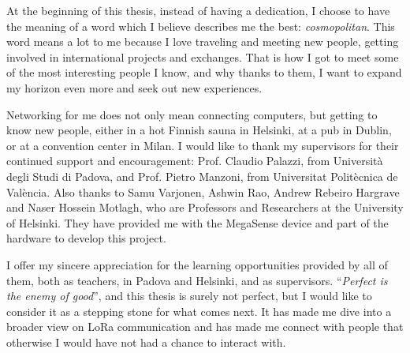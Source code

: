 
At the beginning of this thesis, instead of having a dedication, I choose to have the meaning of a word which I believe describes me the best: \textit{cosmopolitan}.
This word means a lot to me because I love traveling and meeting new people, getting involved in international projects and exchanges.
That is how I got to meet some of the most interesting people I know, and why thanks to them, I want to expand my horizon even more and seek out new experiences.

Networking for me does not only mean connecting computers, but getting to know new people, either in a hot Finnish sauna in Helsinki, at a pub in Dublin, or at a convention center in Milan.
\newline
\newline
\indent
I would like to thank my supervisors for their continued support and encouragement: Prof. Claudio Palazzi, from Università degli Studi di Padova, and Prof. Pietro Manzoni, from Universitat Politècnica de València.
Also thanks to Samu Varjonen, Ashwin Rao, Andrew Rebeiro Hargrave and ‪Naser Hossein Motlagh‬, who are Professors and Researchers at the University of Helsinki.
They have provided me with the MegaSense device and part of the hardware to develop this project.

I offer my sincere appreciation for the learning opportunities provided by all of them, both as teachers, in Padova and Helsinki, and as supervisors.
\newline
\newline
\indent
``\textit{Perfect is the enemy of good}'', and this thesis is surely not perfect, but I would like to consider it as a stepping stone for what comes next.
It has made me dive into a broader view on LoRa communication and has made me connect with people that otherwise I would have not had a chance to interact with.
